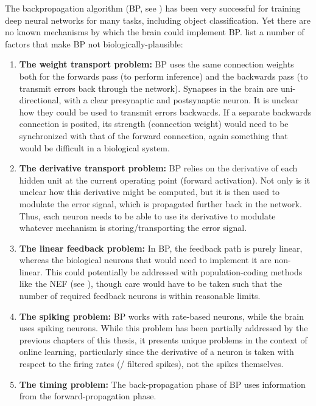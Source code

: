 The backpropagation algorithm (BP, see )
has been very successful for training deep neural networks for many tasks,
including object classification.
Yet there are no known mechanisms by which the brain could implement BP.
\textcite{Bengio2015} list a number of factors
that make BP not biologically-plausible:
\begin{enumerate}
  \item \textbf{The weight transport problem:}
    BP uses the same connection weights
    both for the forwards pass (to perform inference)
    and the backwards pass (to transmit errors back through the network).
    Synapses in the brain are uni-directional,
    with a clear presynaptic and postsynaptic neuron.
    It is unclear how they could be used to transmit errors backwards.
    If a separate backwards connection is posited,
    its strength (connection weight) would need to be synchronized
    with that of the forward connection,
    again something that would be difficult in a biological system.
  \item \textbf{The derivative transport problem:}
    BP relies on the derivative of each hidden unit
    at the current operating point (forward activation).
    Not only is it unclear how this derivative might be computed,
    but it is then used to modulate the error signal,
    which is propagated further back in the network.
    Thus, each neuron needs to be able to use its derivative
    to modulate whatever mechanism is storing/transporting the error signal.
  \item \textbf{The linear feedback problem:}
    In BP, the feedback path is purely linear,
    whereas the biological neurons that would need to implement it are non-linear.
    This could potentially be addressed with population-coding methods
    like the NEF (see ),
    though care would have to be taken such that the number of
    required feedback neurons is within reasonable limits.
  \item \textbf{The spiking problem:}
    BP works with rate-based neurons, while the brain uses spiking neurons.
    While this problem has been partially addressed by the previous chapters
    of this thesis,
    it presents unique problems in the context of online learning,
    particularly since the derivative of a neuron is taken with respect
    to the firing rates (\ie/ filtered spikes), not the spikes themselves.
  \item \textbf{The timing problem:}
    The back-propagation phase of BP uses information
    from the forward-propagation phase.

\end{enumerate}
